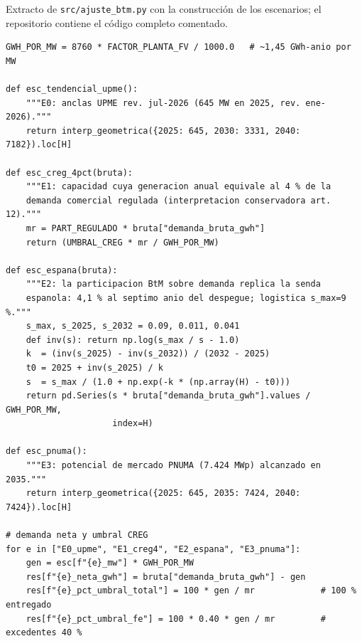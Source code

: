 Extracto de \texttt{src/ajuste\_btm.py} con la construcción de los
escenarios; el repositorio contiene el código completo comentado.

\begingroup\footnotesize
\begin{verbatim}
GWH_POR_MW = 8760 * FACTOR_PLANTA_FV / 1000.0   # ~1,45 GWh-anio por MW

def esc_tendencial_upme():
    """E0: anclas UPME rev. jul-2026 (645 MW en 2025, rev. ene-2026)."""
    return interp_geometrica({2025: 645, 2030: 3331, 2040: 7182}).loc[H]

def esc_creg_4pct(bruta):
    """E1: capacidad cuya generacion anual equivale al 4 % de la
    demanda comercial regulada (interpretacion conservadora art. 12)."""
    mr = PART_REGULADO * bruta["demanda_bruta_gwh"]
    return (UMBRAL_CREG * mr / GWH_POR_MW)

def esc_espana(bruta):
    """E2: la participacion BtM sobre demanda replica la senda
    espanola: 4,1 % al septimo anio del despegue; logistica s_max=9 %."""
    s_max, s_2025, s_2032 = 0.09, 0.011, 0.041
    def inv(s): return np.log(s_max / s - 1.0)
    k  = (inv(s_2025) - inv(s_2032)) / (2032 - 2025)
    t0 = 2025 + inv(s_2025) / k
    s  = s_max / (1.0 + np.exp(-k * (np.array(H) - t0)))
    return pd.Series(s * bruta["demanda_bruta_gwh"].values / GWH_POR_MW,
                     index=H)

def esc_pnuma():
    """E3: potencial de mercado PNUMA (7.424 MWp) alcanzado en 2035."""
    return interp_geometrica({2025: 645, 2035: 7424, 2040: 7424}).loc[H]

# demanda neta y umbral CREG
for e in ["E0_upme", "E1_creg4", "E2_espana", "E3_pnuma"]:
    gen = esc[f"{e}_mw"] * GWH_POR_MW
    res[f"{e}_neta_gwh"] = bruta["demanda_bruta_gwh"] - gen
    res[f"{e}_pct_umbral_total"] = 100 * gen / mr             # 100 % entregado
    res[f"{e}_pct_umbral_fe"] = 100 * 0.40 * gen / mr         # excedentes 40 %
\end{verbatim}
\endgroup
